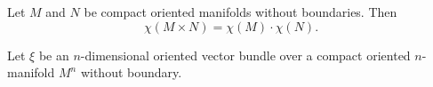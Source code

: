 Let $M$ and $N$ be compact oriented manifolds without boundaries. Then
$$
\chi(M \times N) = \chi(M) \cdot \chi(N).
$$

Let $\xi$ be an $n$-dimensional oriented vector bundle over a compact oriented $n$-manifold $M^{n}$ without boundary.
